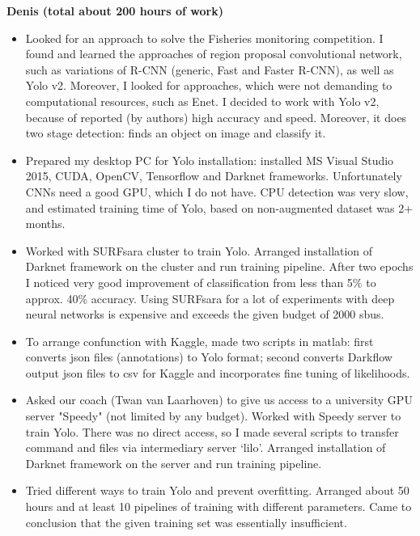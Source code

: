 \documentclass[a4paper]{article}
\begin{document}
\textbf{Denis (total about 200 hours of work)}\\

\begin{itemize}
	\item Looked for an approach to solve the Fisheries monitoring competition. I found and learned the approaches of region proposal convolutional network, such as variations of R-CNN (generic, Fast and Faster R-CNN), as well as Yolo v2. Moreover, I looked for approaches, which were not demanding to computational resources, such as Enet. I decided to work with Yolo v2, because of reported (by authors) high accuracy and speed. Moreover, it does two stage detection: finds an object on image and classify it.
	
	\item Prepared my desktop PC for Yolo installation: installed MS Visual Studio 2015, CUDA, OpenCV, Tensorflow and Darknet frameworks. Unfortunately CNNs need a good GPU, which I do not  have. CPU detection was very slow, and estimated training time of Yolo, based on non-augmented dataset was 2+ months.
	
	\item Worked with SURFsara cluster to train Yolo. Arranged installation of Darknet framework on the cluster and run training pipeline. After two epochs I noticed very good improvement of classification from less than 5\% to approx. 40\% accuracy. Using SURFsara for a lot of experiments with deep neural networks is expensive and exceeds the given budget of 2000 sbus.
	
	\item To arrange confunction with Kaggle, made two scripts in matlab: first converts json files (annotations) to Yolo format; second converts Darkflow output json files to csv for Kaggle and incorporates fine tuning of likelihoods.
	
	\item Asked our coach (Twan van Laarhoven) to give us access to a university GPU server "Speedy" (not limited by any budget). Worked with Speedy server to train Yolo. There was no direct access, so I made several scripts to transfer command and files via intermediary server ‘lilo’. Arranged installation of Darknet framework on the server and run training pipeline.
	
	\item Tried different ways to train Yolo and prevent overfitting. Arranged about 50 hours and at least 10 pipelines of training with different parameters. Came to conclusion that the given training set was essentially insufficient. 
	

\end{itemize}
\end{document}
